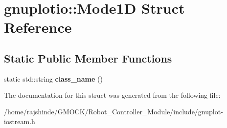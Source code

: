 \hypertarget{structgnuplotio_1_1_mode1_d}{}\section{gnuplotio\+:\+:Mode1D Struct Reference}
\label{structgnuplotio_1_1_mode1_d}
\subsection*{Static Public Member Functions}
\begin{DoxyCompactItemize}
\item 
static std\+::string {\bfseries class\+\_\+name} ()\hypertarget{structgnuplotio_1_1_mode1_d_a508d170d84da4dfb7cd07eebad894b8f}{}\label{structgnuplotio_1_1_mode1_d_a508d170d84da4dfb7cd07eebad894b8f}

\end{DoxyCompactItemize}


The documentation for this struct was generated from the following file\+:\begin{DoxyCompactItemize}
\item 
/home/rajshinde/\+G\+M\+O\+C\+K/\+Robot\+\_\+\+Controller\+\_\+\+Module/include/gnuplot-\/iostream.\+h\end{DoxyCompactItemize}
